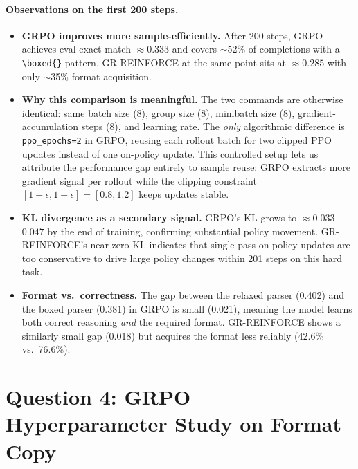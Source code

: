 \documentclass[11pt]{article}
\newcommand{\boxedcmd}{\texttt{\textbackslash boxed\{\}}}
\begin{document}
\paragraph{Observations on the first 200 steps.}
\begin{itemize}[leftmargin=1.5em]
  \item \textbf{GRPO improves more sample-efficiently.}
        After 200 steps, GRPO achieves eval exact match $\approx 0.333$ and covers
        $\sim$52\% of completions with a \boxedcmd{} pattern.
        GR-REINFORCE at the same point sits at $\approx 0.285$ with only $\sim$35\%
        format acquisition.
  \item \textbf{Why this comparison is meaningful.}
        The two commands are otherwise identical: same batch size (8), group size (8),
        minibatch size (8), gradient-accumulation steps (8), and learning rate.
        The \emph{only} algorithmic difference is \texttt{ppo\_epochs=2} in GRPO,
        reusing each rollout batch for two clipped PPO updates instead of one on-policy
        update.
        This controlled setup lets us attribute the performance gap entirely to sample
        reuse: GRPO extracts more gradient signal per rollout while the clipping
        constraint $[1-\epsilon, 1+\epsilon] = [0.8, 1.2]$ keeps updates stable.
  \item \textbf{KL divergence as a secondary signal.}
        GRPO's KL grows to $\approx 0.033$--$0.047$ by the end of training, confirming
        substantial policy movement.
        GR-REINFORCE's near-zero KL indicates that single-pass on-policy updates are
        too conservative to drive large policy changes within 201 steps on this hard task.
  \item \textbf{Format vs.\ correctness.}
        The gap between the relaxed parser (0.402) and the boxed parser (0.381) in GRPO
        is small (0.021), meaning the model learns both correct reasoning \emph{and} the
        required format.
        GR-REINFORCE shows a similarly small gap (0.018) but acquires the format less
        reliably (42.6\% vs.\ 76.6\%).
\end{itemize}

\section*{Question 4: GRPO Hyperparameter Study on Format Copy}
\label{sec:ablation}
\end{document}
